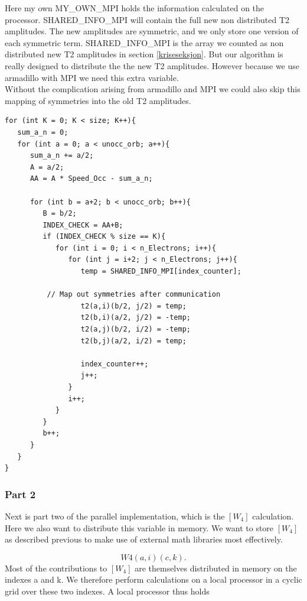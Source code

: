 \documentclass[a4paper,norsk,11pt,twoside]{report}
\begin{document}
Here my own MY\_OWN\_MPI holds the information calculated on the processor. SHARED\_INFO\_MPI will contain the full new non distributed T2 amplitudes. The new amplitudes are symmetric, and we only store one version of each symmetric term. SHARED\_INFO\_MPI is the array we counted as non distributed new T2 amplitudes in section \ref{kriseseksjon}. But our algorithm is really designed to distribute the the new T2 amplitudes. However because we use armadillo with MPI we need this extra variable.\\

Without the complication arising from armadillo and MPI we could also skip this mapping of symmetries into the old T2 amplitudes.

\begin{lstlisting}
for (int K = 0; K < size; K++){
   sum_a_n = 0;
   for (int a = 0; a < unocc_orb; a++){
      sum_a_n += a/2;
      A = a/2;
      AA = A * Speed_Occ - sum_a_n;

      for (int b = a+2; b < unocc_orb; b++){
         B = b/2;
         INDEX_CHECK = AA+B;
         if (INDEX_CHECK % size == K){
            for (int i = 0; i < n_Electrons; i++){
               for (int j = i+2; j < n_Electrons; j++){
                  temp = SHARED_INFO_MPI[index_counter];

          // Map out symmetries after communication
                  t2(a,i)(b/2, j/2) = temp;
                  t2(b,i)(a/2, j/2) = -temp;
                  t2(a,j)(b/2, i/2) = -temp;
                  t2(b,j)(a/2, i/2) = temp;

                  index_counter++;
                  j++;
               }
               i++;
            }
         }
         b++;
      }
   }
}
\end{lstlisting}

\subsubsection{Part 2}
Next is part two of the parallel implementation, which is the $[W_4]$ calculation. Here we also want to distribute this variable in memory. We want to store $[W_4]$ as described previous to make use of external math libraries most effectively.

\begin{equation}
W4(a,i)(c,k) .
\end{equation}
Most of the contributions to $[W_4]$ are themselves distributed in memory on the indexes a and k. We therefore perform calculations on a local processor in a cyclic grid over these two indexes. A local processor thus holds
\end{document}
